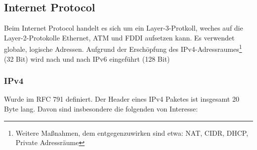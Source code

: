 \documentclass{article} %
\begin{document}
\subsection{Internet Protocol}
\label{subsec:ip}
Beim Internet Protocol handelt es sich um ein Layer-3-Protkoll, weches auf die Layer-2-Protokolle Ethernet, ATM und FDDI aufsetzen kann.
Es verwendet globale, logische Adressen.
Aufgrund der Erschöpfung des IPv4-Adressraumes\footnote{Weitere Maßnahmen, dem entgegenzuwirken sind etwa: NAT, CIDR, DHCP, Private Adressräume} (32 Bit) wird nach und nach IPv6 eingeführt (128 Bit)

\subsubsection{IPv4}
Wurde im RFC 791\cite{rfc791} definiert.
Der Header eines IPv4 Paketes ist insgesamt 20 Byte lang.
Davon sind insbesondere die folgenden von Interesse:
\end{document}
